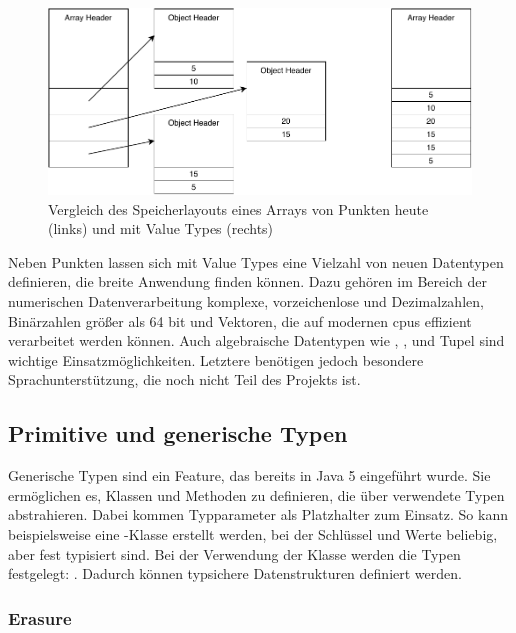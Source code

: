 \begin{figure}
    \centering
    \includegraphics[width=\textwidth]{img/memory-usage.pdf}
    \vspace{-3ex}
    \caption{Vergleich des Speicherlayouts eines Arrays von Punkten heute (links) und mit Value Types (rechts)}
    \label{fig:memory-usage}
\end{figure}

Neben Punkten lassen sich mit Value Types eine Vielzahl von neuen Datentypen definieren, die breite Anwendung finden können.
Dazu gehören im Bereich der numerischen Datenverarbeitung komplexe, vorzeichenlose und Dezimalzahlen, Binärzahlen größer als 64 bit und Vektoren, die auf modernen \acp{cpu} effizient verarbeitet werden können.
Auch algebraische Datentypen wie , ,  und Tupel sind wichtige Einsatzmöglichkeiten.
Letztere benötigen jedoch besondere Sprachunterstützung, die noch nicht Teil des Projekts ist.

\subsection{Primitive und generische Typen}\label{subsec:primitive-generics}

Generische Typen sind ein Feature, das bereits in Java 5 eingeführt wurde.
Sie ermöglichen es, Klassen und Methoden zu definieren, die über verwendete Typen abstrahieren.
Dabei kommen Typparameter als Platzhalter zum Einsatz.
So kann beispielsweise eine -Klasse erstellt werden, bei der Schlüssel und Werte beliebig, aber fest typisiert sind.
Bei der Verwendung der Klasse werden die Typen festgelegt: .
Dadurch können typsichere Datenstrukturen definiert werden.

\subsubsection{Erasure}

